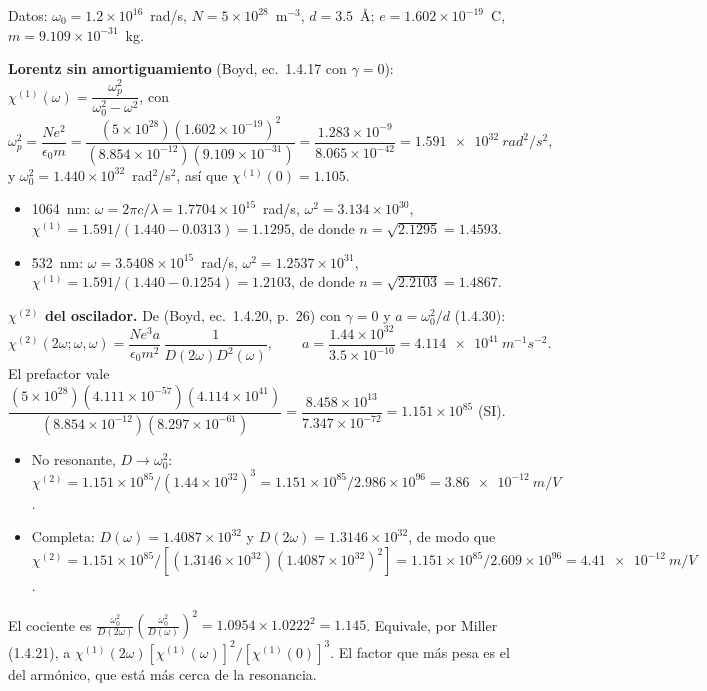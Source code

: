 \label{sol:39}

Datos: $\omega_0=1.2\times10^{16}$~rad/s, $N=5\times10^{28}$~m$^{-3}$, $d=3.5$~Å; $e=1.602\times10^{-19}$~C, $m=9.109\times10^{-31}$~kg.

 \textbf{Lorentz sin amortiguamiento} (Boyd, ec.~1.4.17 con $\gamma=0$): $\chi^{(1)}(\omega)=\dfrac{\omega_p^2}{\omega_0^2-\omega^2}$, con
\[
\omega_p^2=\frac{Ne^2}{\epsilon_0m}=\frac{(5\times10^{28})(1.602\times10^{-19})^2}{(8.854\times10^{-12})(9.109\times10^{-31})}=\frac{1.283\times10^{-9}}{8.065\times10^{-42}}=\SI{1.591e32}{rad^2/s^2},
\]
y $\omega_0^2=1.440\times10^{32}$~rad$^2$/s$^2$, así que $\chi^{(1)}(0)=1.105$.
\begin{itemize}
\item 1064~nm: $\omega=2\pi c/\lambda=1.7704\times10^{15}$~rad/s, $\omega^2=3.134\times10^{30}$, $\chi^{(1)}=1.591/(1.440-0.0313)=1.1295$, de donde
$n=\sqrt{2.1295}=1.4593$.
\item 532~nm: $\omega=3.5408\times10^{15}$~rad/s, $\omega^2=1.2537\times10^{31}$, $\chi^{(1)}=1.591/(1.440-0.1254)=1.2103$, de donde $n=\sqrt{2.2103}=1.4867$.
\end{itemize}

 \textbf{$\chi^{(2)}$ del oscilador.} De (Boyd, ec.~1.4.20, p.~26) con $\gamma=0$ y $a=\omega_0^2/d$ (1.4.30):
\[
\chi^{(2)}(2\omega;\omega,\omega)=\frac{Ne^3a}{\epsilon_0m^2}\,\frac{1}{D(2\omega)D^2(\omega)},\qquad a=\frac{1.44\times10^{32}}{3.5\times10^{-10}}=\SI{4.114e41}{m^{-1}s^{-2}}.
\]
El prefactor vale
$\dfrac{(5\times10^{28})(4.111\times10^{-57})(4.114\times10^{41})}{(8.854\times10^{-12})(8.297\times10^{-61})}=\dfrac{8.458\times10^{13}}{7.347\times10^{-72}}=1.151\times10^{85}$ (SI).
\begin{itemize}
\item No resonante, $D\to\omega_0^2$: $\chi^{(2)}=1.151\times10^{85}/(1.44\times10^{32})^3=1.151\times10^{85}/2.986\times10^{96}=\SI{3.86e-12}{m/V}$.
\item Completa: $D(\omega)=1.4087\times10^{32}$ y $D(2\omega)=1.3146\times10^{32}$, de modo que
$\chi^{(2)}=1.151\times10^{85}/[(1.3146\times10^{32})(1.4087\times10^{32})^2]=1.151\times10^{85}/2.609\times10^{96}=\SI{4.41e-12}{m/V}$.
\end{itemize}
El cociente es $\frac{\omega_0^2}{D(2\omega)}\left(\frac{\omega_0^2}{D(\omega)}\right)^2=1.0954\times1.0222^2=1.145$. Equivale, por Miller (1.4.21), a
$\chi^{(1)}(2\omega)[\chi^{(1)}(\omega)]^2/[\chi^{(1)}(0)]^3$. El factor que más pesa es el del armónico, que está más cerca de la resonancia.

